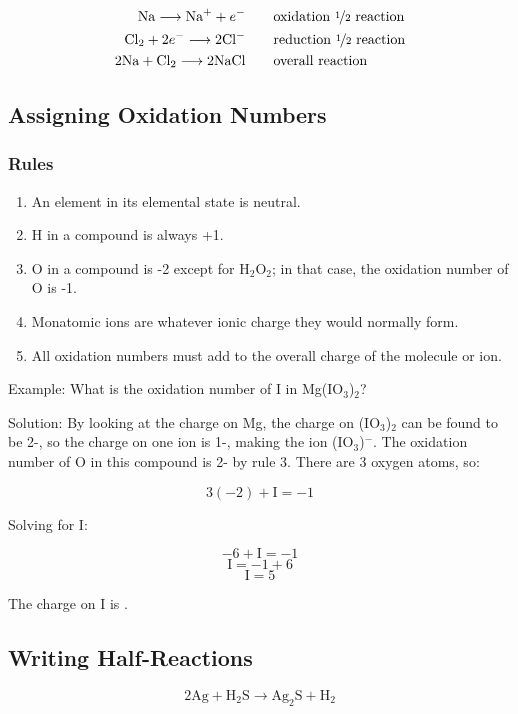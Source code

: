 \documentclass[a4paper, 12pt]{article}
\begin{document}
\begin{align*}
\text{Na} \longrightarrow \text{Na}^+ + e^- \hspace{2em} & \text{oxidation \nicefrac12 reaction} \\
\text{Cl}_2 + 2e^- \longrightarrow 2\text{Cl}^- \hspace{2em} & \text{reduction \nicefrac12 reaction} \\
2\text{Na} + \text{Cl}_2 \longrightarrow 2\text{NaCl} \hspace{2em} & \text{overall reaction}
\end{align*}

\subsection{Assigning Oxidation Numbers}

\subsubsection{Rules}
\begin{enumerate}
\item An element in its elemental state is neutral.
\item H in a compound is always +1.
\item O in a compound is -2 except for H$_2$O$_2$; in that case, the oxidation number of O is -1.
\item Monatomic ions are whatever ionic charge they would normally form.
\item All oxidation numbers must add to the overall charge of the molecule or ion.
\end{enumerate}

Example: What is the oxidation number of I in Mg(IO$_3$)$_2$?

Solution: By looking at the charge on Mg, the charge on (IO$_3$)$_2$ can be found to be 2-, so the charge on one ion is 1-, making the ion (IO$_3$)$^-$. The oxidation number of O in this compound is 2- by rule 3. There are 3 oxygen atoms, so:

$$3(-2) + \text{I} = -1$$

Solving for I:

$$-6 + \text{I} = -1$$
$$\text{I} = -1+6$$
$$\text{I} = 5$$

The charge on I is .

\subsection{Writing Half-Reactions}
$$2\text{Ag} + \text{H}_2\text{S} \longrightarrow \text{Ag}_2\text{S} + \text{H}_2$$
\end{document}

